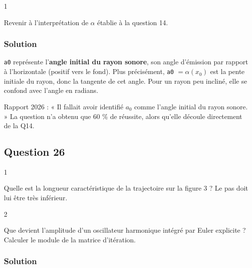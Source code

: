 \documentclass[11pt,a4paper]{article}
\begin{document}
\begin{indication}{1}

Revenir à l'interprétation de \(\alpha\) établie à la question 14.

\end{indication}

\hypertarget{solution-24}{%
\subsubsection{Solution}\label{solution-24}}

\texttt{a0} représente l'\textbf{angle initial du rayon sonore}, son angle d'émission par rapport à l'horizontale (positif vers le fond). Plus précisément, \texttt{a0} \(= \alpha(x_0)\) est la pente initiale du rayon, donc la tangente de cet angle. Pour un rayon peu incliné, elle se confond avec l'angle en radians.

\begin{jury}

Rapport 2026 : « Il fallait avoir identifié \(a_0\) comme l'angle initial du rayon sonore. » La question n'a obtenu que 60 \% de réussite, alors qu'elle découle directement de la Q14.

\end{jury}

\hypertarget{question-26}{%
\subsection{Question 26}\label{question-26}}

\begin{indication}{1}

Quelle est la longueur caractéristique de la trajectoire sur la figure 3 ? Le pas doit lui être très inférieur.

\end{indication}

\begin{indication}{2}

Que devient l'amplitude d'un oscillateur harmonique intégré par Euler explicite ? Calculer le module de la matrice d'itération.

\end{indication}

\hypertarget{solution-25}{%
\subsubsection{Solution}\label{solution-25}}
\end{document}
